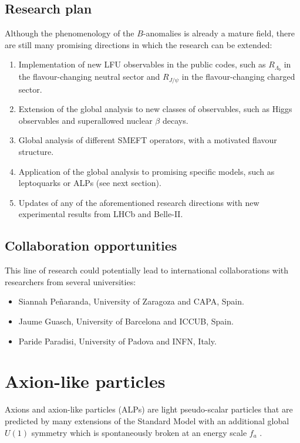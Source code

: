 \documentclass[12pt, a4paper]{article}
\begin{document}
\subsection{Research plan}
Although the phenomenology of the $B$-anomalies is already a mature field, there are still many promising directions in which the research can be extended:
\begin{enumerate}
\item Implementation of new LFU observables in the public codes, such as $R_{\Lambda_b}$ in the flavour-changing neutral sector and $R_{J/\psi}$ in the flavour-changing charged sector.
\item Extension of the global analysis to new classes of observables, such as Higgs observables and superallowed nuclear $\beta$ decays.
\item Global analysis of different SMEFT operators, with a motivated flavour structure.
\item Application of the global analysis to promising specific models, such as leptoquarks or ALPs (see next section). 
\item Updates of any of the aforementioned research directions with new experimental results from LHCb and Belle-II.
\end{enumerate}

\subsection{Collaboration opportunities}
This line of research could potentially lead to international collaborations with researchers from several universities:
\begin{itemize}
\item Siannah Peñaranda, University of Zaragoza and CAPA, Spain.
\item Jaume Guasch, University of Barcelona and ICCUB, Spain.
\item Paride Paradisi, University of Padova and INFN, Italy.
\end{itemize}

\section{Axion-like particles}
Axions and axion-like particles (ALPs) are light pseudo-scalar particles that are predicted by many extensions of the Standard Model with an additional global $U(1)$ symmetry which is spontaneously broken at an energy scale $f_a$ \cite{Peccei:1977hh,Wilczek:1977pj,Weinberg:1977ma}. 
\end{document}
